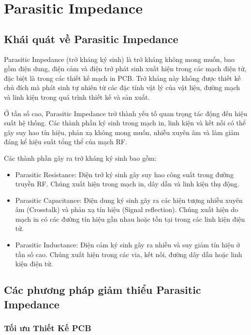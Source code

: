 \chapter{Parasitic Impedance}

\section{Khái quát về Parasitic Impedance}

Parasitic Impedance (trở kháng ký sinh) là trở kháng không mong muốn, bao gồm điện dung, điện cảm và điện trở phát sinh xuất hiện trong các mạch điện tử, đặc biệt là trong các thiết kế mạch in PCB. Trở kháng này không được thiết kế chủ đích mà phát sinh tự nhiên từ các đặc tính vật lý của vật liệu, đường mạch và linh kiện trong quá trình thiết kế và sản xuất.

Ở tần số cao, Parasitic Impedance trở thành yếu tố quan trọng tác động đến hiệu suất hệ thống. Các thành phần ký sinh trong mạch in, linh kiện và kết nối có thể gây suy hao tín hiệu, phản xạ không mong muốn, nhiễu xuyên âm và làm giảm đáng kể hiệu suất tổng thể của mạch RF.

Các thành phần gây ra trở kháng ký sinh bao gồm:
\begin{itemize}
    \item Parasitic Resistance: Điện trở ký sinh gây suy hao công suất trong đường truyền RF. Chúng xuất hiện trong mạch in, dây dẫn và linh kiện thụ động.
    \item Parasitic Capacitance: Điện dung ký sinh gây ra các hiện tượng nhiễu xuyên âm (Crosstalk) và phản xạ tín hiệu (Signal reflection). Chúng xuất hiện do mạch in có các đường tín hiệu gần nhau hoặc tồn tại trong các linh kiện điện tử.
    \item Parasitic Inductance: Điện cảm ký sinh gây ra nhiễu và suy giảm tín hiệu ở tần số cao. Chúng xuất hiện trong các via, kết nối, đường dây dẫn hoặc linh kiện điện tử.
\end{itemize}

\section{Các phương pháp giảm thiểu Parasitic Impedance}

\subsection{Tối ưu Thiết Kế PCB}

